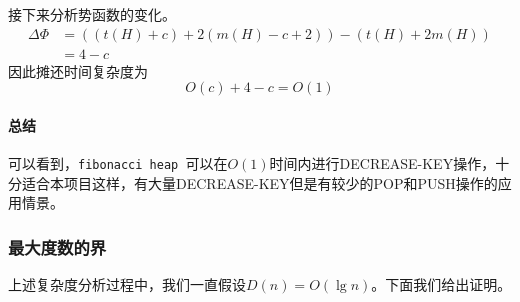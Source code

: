 \documentclass{ctexart}
\newcommand{\fibheap}{\texttt{fibonacci heap }}
\begin{document}
接下来分析势函数的变化。
\begin{align*}
    \Delta \Phi &= ((t(H) + c) + 2(m(H) - c + 2)) - (t(H) + 2m(H)) \\
    &= 4 - c
\end{align*}
因此摊还时间复杂度为
\begin{equation*}
    O(c) + 4 - c = O(1)
\end{equation*}

\paragraph{总结}
可以看到，\fibheap 可以在$O(1)$时间内进行DECREASE-KEY操作，十分适合本项目这样，有大量DECREASE-KEY但是有较少的POP和PUSH操作的应用情景。

\subsubsection{最大度数的界}
上述复杂度分析过程中，我们一直假设$D(n) = O(\lg n)$。下面我们给出证明。
\end{document}
